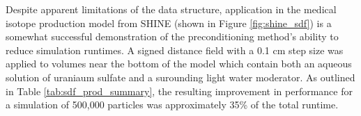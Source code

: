 \setcounter{footnote}{1}

\begin{table}[H]
  \small
  \caption{An summary of the relative number of calls to the various Monte Carlo
    geometric queries for several DAGMC production models. \protect\footnotemark}
  \label{tab:geom_query_ratios}
\end{table}  


Despite apparent limitations of the data structure, application in the medical
isotope production model from SHINE (shown in Figure \ref{fig:shine_sdf}) is a
somewhat successful demonstration of the preconditioning method's ability to
reduce simulation runtimes. A signed distance field with a 0.1 cm step size was
applied to volumes near the bottom of the model which contain both an aqueous
solution of uraniaum sulfate and a surounding light water moderator. As outlined
in Table \ref{tab:sdf_prod_summary}, the resulting improvement in performance
for a simulation of 500,000 particles was approximately 35\% of the total
runtime.


